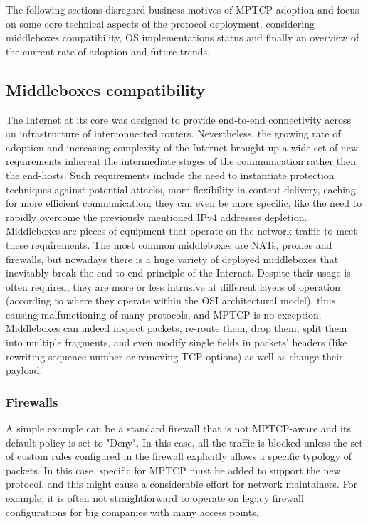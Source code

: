 The following sections disregard business motives of MPTCP adoption and focus on some core technical aspects of the protocol deployment, considering middleboxes compatibility, OS implementations status and finally an overview of the current rate of adoption and future trends.

\subsection{Middleboxes compatibility}
The Internet at its core was designed to provide end-to-end connectivity across an infrastructure of interconnected routers. Nevertheless, the growing rate of adoption and increasing complexity of the Internet brought up a wide set of new requirements inherent the intermediate stages of the communication rather then the end-hosts. Such requirements include the need to instantiate protection techniques against potential attacks, more flexibility in content delivery, caching for more efficient communication; they can even be more specific, like the need to rapidly overcome the previously mentioned IPv4 addresses depletion. Middleboxes are pieces of equipment that operate on the network traffic to meet these requirements. The most common middleboxes are NATs, proxies and firewalls, but nowadays there is a huge variety of deployed middleboxes that inevitably break the end-to-end principle of the Internet. Despite their usage is often required, they are more or less intrusive at different layers of operation (according to where they operate within the OSI architectural model), thus causing malfunctioning of many protocols, and MPTCP is no exception. Middleboxes can indeed inspect packets, re-route them, drop them, split them into multiple fragments, and even modify single fields in packets' headers (like rewriting sequence number or removing TCP options) as well as change their payload.

\subsubsection{Firewalls}
A simple example can be a standard firewall that is not MPTCP-aware and its default policy is set to "Deny". In this case, all the traffic is blocked unless the set of custom rules configured in the firewall explicitly allows a specific typology of packets. In this case, specific for MPTCP must be added to support the new protocol, and this might cause a considerable effort for network maintainers. For example, it is often not straightforward to operate on legacy firewall configurations for big companies with many access points.

